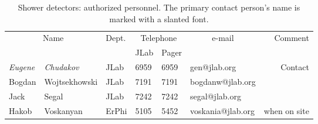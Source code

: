  \begin{table}[ht]
\begin{center}
\begin{tabular}{|ll|l|l|l|l|r|} \hline
  \multicolumn{2}{|c|}{Name} & Dept. & \multicolumn{2}{c|}{Telephone} & 
  \multicolumn{1}{c|}{e-mail} & Comment \\ 
  \cline{4-5}
   &  &   & JLab & Pager &  & \\ 
\hline
 {\em Eugene} & {\em Chudakov}  & JLab    & 6959 & 6959 & gen@jlab.org      & Contact     \\ 
 Bogdan       & Wojtsekhowski   & JLab    & 7191 & 7191 & bogdanw@jlab.org  &  \\ 
 Jack         & Segal           & JLab    & 7242 & 7242 & segal@jlab.org    &  \\ 
 Hakob        & Voskanyan       & ErPhi   & 5105 & 5452 & voskania@jlab.org & when on site \\ 
\hline
\end{tabular}
\end{center}
\caption[Shower detectors: authorized personnel]{
   Shower detectors: authorized personnel. The primary contact person's
   name is marked with a slanted font. 
}
\label{tab:shower-personnel}
\end{table}
 

%
%
%
%
